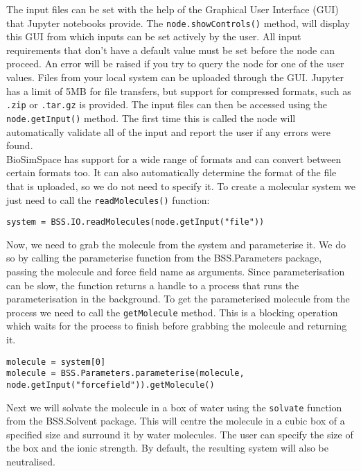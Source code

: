\documentclass[9pt,tutorial]{livecoms}
\begin{document}
The input files can be set with the help of the Graphical User Interface (GUI) that Jupyter notebooks provide. The \texttt{node.showControls()}
method, will display this GUI from which inputs can be set actively by the user. All input requirements that don't have a default value must be set before the node can proceed. An error will be raised if you try to query the node for one of the user values. Files from your local system can be uploaded through the GUI. Jupyter has a limit of 5MB for file transfers, but support for compressed formats, such as \texttt{.zip} or \texttt{.tar.gz} is provided. The input files can then be accessed using the \texttt{node.getInput()} method. The first time this is called the node will automatically validate all of the input and report the user if any errors were found. \\

BioSimSpace has support for a wide range of formats and can convert between certain formats too. It can also automatically determine the format of the file that is uploaded, so we do not need to specify it. To create a molecular system we just need to call the \texttt{readMolecules()} function: 

\begin{verbatim}
system = BSS.IO.readMolecules(node.getInput("file"))
\end{verbatim}

Now, we need to grab the molecule from the system and parameterise it. We do so by calling the parameterise function from the BSS.Parameters package, passing the molecule and force field name as arguments. Since parameterisation can be slow, the function returns a handle to a process that runs the parameterisation in the background. To get the parameterised molecule from the process we need to call the \texttt{getMolecule} method. This is a blocking operation which waits for the process to finish before grabbing the molecule and returning it.

\begin{verbatim}
molecule = system[0]
molecule = BSS.Parameters.parameterise(molecule,
node.getInput("forcefield")).getMolecule()
\end{verbatim}

Next we will solvate the molecule in a box of water using the \texttt{solvate} function from the BSS.Solvent package. This will centre the molecule in a cubic box of a specified size and surround it by water molecules. The user can specify the size of the box and the ionic strength. By default, the resulting system will also be neutralised.
\end{document}
